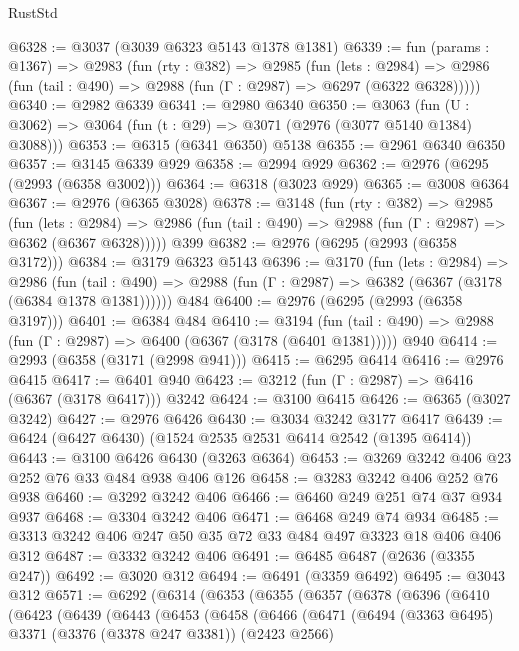 \begin{lexlean}{RustStd}
\begin{coremodule}
@6328 := @3037 (@3039 @6323 @5143 @1378 @1381)
@6339 := fun (params : @1367) =>
  @2983
    (fun (rty : @382) =>
    @2985
      (fun (lets : @2984) =>
      @2986 (fun (tail : @490) => @2988 (fun (Γ : @2987) => @6297 (@6322 @6328)))))
@6340 := @2982 @6339
@6341 := @2980 @6340
@6350 := @3063 (fun (U : @3062) => @3064 (fun (t : @29) => @3071 (@2976 (@3077 @5140 @1384) @3088)))
@6353 := @6315 (@6341 @6350) @5138
@6355 := @2961 @6340 @6350
@6357 := @3145 @6339 @929
@6358 := @2994 @929
@6362 := @2976 (@6295 (@2993 (@6358 @3002)))
@6364 := @6318 (@3023 @929)
@6365 := @3008 @6364
@6367 := @2976 (@6365 @3028)
@6378 := @3148
    (fun (rty : @382) =>
    @2985
      (fun (lets : @2984) =>
      @2986 (fun (tail : @490) => @2988 (fun (Γ : @2987) => @6362 (@6367 @6328)))))
    @399
@6382 := @2976 (@6295 (@2993 (@6358 @3172)))
@6384 := @3179 @6323 @5143
@6396 := @3170
    (fun (lets : @2984) =>
    @2986
      (fun (tail : @490) => @2988 (fun (Γ : @2987) => @6382 (@6367 (@3178 (@6384 @1378 @1381))))))
    @484
@6400 := @2976 (@6295 (@2993 (@6358 @3197)))
@6401 := @6384 @484
@6410 := @3194
    (fun (tail : @490) => @2988 (fun (Γ : @2987) => @6400 (@6367 (@3178 (@6401 @1381)))))
    @940
@6414 := @2993 (@6358 (@3171 (@2998 @941)))
@6415 := @6295 @6414
@6416 := @2976 @6415
@6417 := @6401 @940
@6423 := @3212 (fun (Γ : @2987) => @6416 (@6367 (@3178 @6417))) @3242
@6424 := @3100 @6415
@6426 := @6365 (@3027 @3242)
@6427 := @2976 @6426
@6430 := @3034 @3242 @3177 @6417
@6439 := @6424 (@6427 @6430) (@1524 @2535 @2531 @6414 @2542 (@1395 @6414))
@6443 := @3100 @6426 @6430 (@3263 @6364)
@6453 := @3269 @3242 @406 @23 @252 @76 @33 @484 @938 @406 @126
@6458 := @3283 @3242 @406 @252 @76 @938
@6460 := @3292 @3242 @406
@6466 := @6460 @249 @251 @74 @37 @934 @937
@6468 := @3304 @3242 @406
@6471 := @6468 @249 @74 @934
@6485 := @3313 @3242 @406 @247 @50 @35 @72 @33 @484 @497 @3323 @18 @406 @406 @312
@6487 := @3332 @3242 @406
@6491 := @6485 @6487 (@2636 (@3355 @247))
@6492 := @3020 @312
@6494 := @6491 (@3359 @6492)
@6495 := @3043 @312
@6571 := @6292
    (@6314
      (@6353
        (@6355
          (@6357
            (@6378
              (@6396
                (@6410
                  (@6423
                    (@6439
                      (@6443
                        (@6453
                          (@6458
                            (@6466
                              (@6471
                                (@6494
                                  (@3363 @6495)
                                  @3371
                                  (@3376 (@3378 @247 @3381))
                                  (@2423 @2566)

\end{coremodule}
\end{lexlean}

